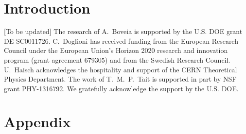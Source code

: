 \documentclass[a4paper, 11pt,notoc]{article}
\begin{document}

\section{Introduction}
\label{sec:introduction}



\acknowledgments 

[To be updated] The research of A.~Boveia is supported by the U.S. DOE grant  DE-SC0011726. C.~Doglioni has received funding from the European Research Council under the European Union's Horizon 2020 research and innovation program (grant agreement 679305) and from the Swedish Research Council. U.~Haisch acknowledges the hospitality and support of the CERN Theoretical Physics Department. The work of T.~M.~P.~Tait is supported in part by NSF grant PHY-1316792. We gratefully acknowledge the support by the U.S. DOE. 


\appendix

\section{Appendix}
\label{app:recast}
\newpage 

%
%
\end{document}

